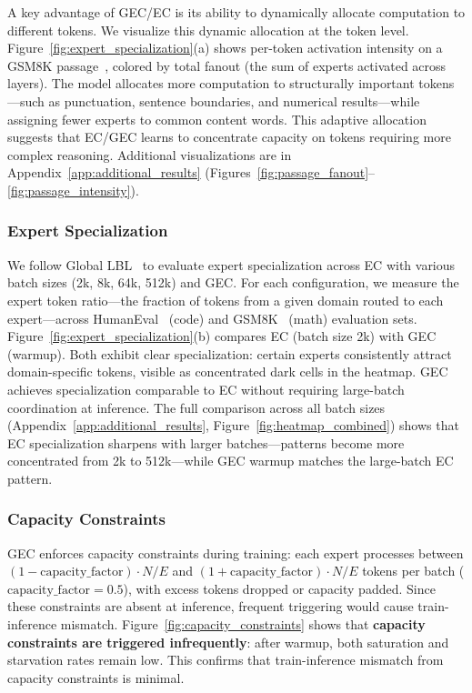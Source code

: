 \documentclass{article}
\theoremstyle{plain}
\theoremstyle{definition}
\theoremstyle{remark}
\begin{document}
A key advantage of GEC/EC is its ability to dynamically allocate computation to different tokens. We visualize this dynamic allocation at the token level. Figure~\ref{fig:expert_specialization}(a) shows per-token activation intensity on a GSM8K passage~\citep{cobbe2021training}, colored by total fanout (the sum of experts activated across layers). The model allocates more computation to structurally important tokens---such as punctuation, sentence boundaries, and numerical results---while assigning fewer experts to common content words. This adaptive allocation suggests that EC/GEC learns to concentrate capacity on tokens requiring more complex reasoning. Additional visualizations are in Appendix~\ref{app:additional_results} (Figures~\ref{fig:passage_fanout}--\ref{fig:passage_intensity}).

\subsubsection{Expert Specialization}
\label{sec:expert_specialization} 


We follow Global LBL~\cite{qiu2025demonsdetailimplementingload} to evaluate expert specialization across EC with various batch sizes (2k, 8k, 64k, 512k) and GEC. For each configuration, we measure the expert token ratio---the fraction of tokens from a given domain routed to each expert---across HumanEval~\citep{chen2021evaluating} (code) and GSM8K~\citep{cobbe2021training} (math) evaluation sets. Figure~\ref{fig:expert_specialization}(b) compares EC (batch size 2k) with GEC (warmup). Both exhibit clear specialization: certain experts consistently attract domain-specific tokens, visible as concentrated dark cells in the heatmap. GEC achieves specialization comparable to EC without requiring large-batch coordination at inference. The full comparison across all batch sizes (Appendix~\ref{app:additional_results}, Figure~\ref{fig:heatmap_combined}) shows that EC specialization sharpens with larger batches---patterns become more concentrated from 2k to 512k---while GEC warmup matches the large-batch EC pattern.



\subsubsection{Capacity Constraints}
\label{sec:capacity}

GEC enforces capacity constraints during training: each expert processes between $(1-\text{capacity\_factor}) \cdot N / E$ and $(1+\text{capacity\_factor}) \cdot N / E$ tokens per batch ($\text{capacity\_factor} = 0.5$), with excess tokens dropped or capacity padded. Since these constraints are absent at inference, frequent triggering would cause train-inference mismatch. Figure~\ref{fig:capacity_constraints} shows that \textbf{capacity constraints are triggered infrequently}: after warmup, both saturation and starvation rates remain low. This confirms that train-inference mismatch from capacity constraints is minimal.
\end{document}
